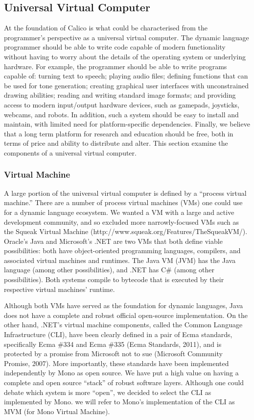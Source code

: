 \documentclass[preprint]{sigplanconf}
\begin{document}
\subsection{Universal Virtual Computer}

At the foundation of Calico is what could be characterised from the
programmer's perspective as a universal virtual computer. The dynamic
language programmer should be able to write code capable of modern
functionality without having to worry about the details of the
operating system or underlying hardware. For example, the programmer
should be able to write programs capable of: turning text to speech;
playing audio files; defining functions that can be used for tone
generation; creating graphical user interfaces with unconstrained
drawing abilities; reading and writing standard image formats; and
providing access to modern input/output hardware devices, such as
gamepads, joysticks, webcams, and robots. In addition, such a system
should be easy to install and maintain, with limited need for
platform-specific dependencies. Finally, we believe that a long term
platform for research and education should be free, both in terms of
price and ability to distribute and alter. This section examine the
components of a universal virtual computer.

\subsubsection{Virtual Machine}

A large portion of the universal virtual computer is defined by a
``process virtual machine.'' There are a number of process virtual
machines (VMs) one could use for a dynamic language ecosystem. We
wanted a VM with a large and active development community, and so
excluded more narrowly-focused VMs such as the Squeak Virtual Machine
(http://www.squeak.org/Features/TheSqueakVM/). Oracle's Java and
Microsoft's .NET are two VMs that both define viable possibilities:
both have object-oriented programming languages, compilers, and
associated virtual machines and runtimes. The Java VM (JVM) has the
Java language (among other possibilities), and .NET has C\# (among
other possibilities). Both systems compile to bytecode that is
executed by their respective virtual machines' runtime.

Although both VMs have served as the foundation for dynamic languages,
Java does not have a complete and robust official open-source
implementation. On the other hand, .NET’s virtual machine components,
called the Common Language Infrastructure (CLI), have been clearly
defined in a pair of Ecma standards, specifically Ecma \#334 and Ecma
\#335 (Ecma Standards, 2011), and is protected by a promise from
Microsoft not to sue (Microsoft Community Promise, 2007). More
importantly, these standards have been implemented independently by
Mono as open source. We have put a high value on having a complete and
open source ``stack'' of robust software layers. Although one could
debate which system is more ``open'', we decided to select the CLI as
implemented by Mono. we will refer to Mono's implementation of the CLI
as MVM (for Mono Virtual Machine).
\end{document}
